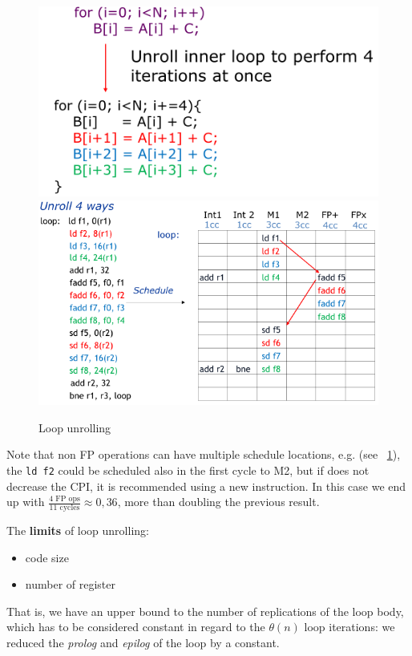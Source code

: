 \begin{figure}[h]
    \centering
    \includegraphics[scale = 0.4]{images/loop-unrolling-1}
    \includegraphics[scale = 0.4]{images/loop-unrolling-2}
    \caption{Loop unrolling}
    \label{fig:loop-unrolling}
\end{figure}

Note that non FP operations can have multiple schedule locations, e.g. (see ~\ref{fig:loop-unrolling}), the \verb|ld f2|
could be
scheduled also in the first cycle to M2, but if does not decrease the CPI, it is recommended using a new instruction.
In this case we end up with \(\frac{4\text{ FP ops}}{11\text{ cycles}} \approx 0,36\), more than doubling the
previous result.

The \textbf{limits} of loop unrolling:
\begin{itemize}
    \item[] code size
    \item[] number of register
\end{itemize}
That is, we have an upper bound to the number of replications of the loop body, which has to be considered constant
in regard to the $\theta(n)$ loop iterations: we reduced the \textit{prolog} and \textit{epilog} of the loop by
a constant.

